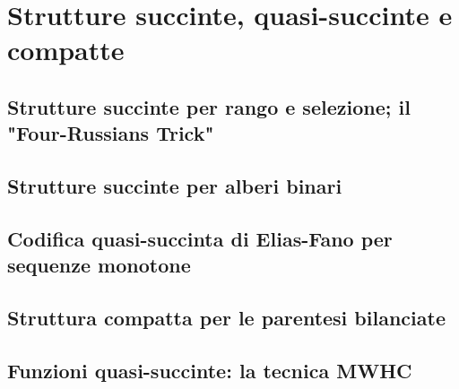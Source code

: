 \section{Strutture succinte, quasi-succinte e compatte}
\subsection{Strutture succinte per rango e selezione; il "Four-Russians Trick"}
\subsection{Strutture succinte per alberi binari}
\subsection{Codifica quasi-succinta di Elias-Fano per sequenze monotone}
\subsection{Struttura compatta per le parentesi bilanciate}
\subsection{Funzioni quasi-succinte: la tecnica MWHC}